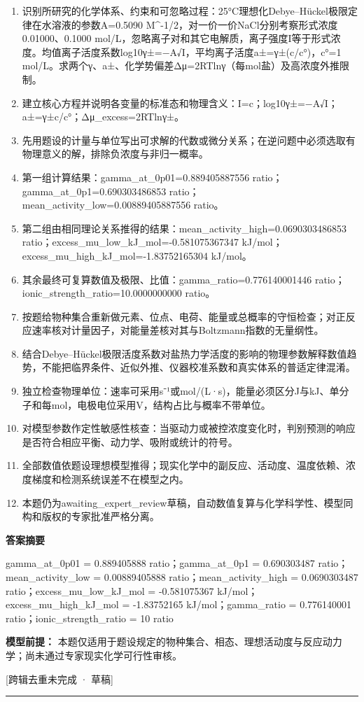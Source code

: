 \documentclass[UTF8,11pt,a4paper]{ctexart}
\begin{document}
\begin{enumerate}
\item 识别所研究的化学体系、约束和可忽略过程：25°C理想化Debye–Hückel极限定律在水溶液的参数A=0.5090 M\textasciicircum{}-1/2，对一价一价NaCl分别考察形式浓度0.01000、0.1000 mol/L，忽略离子对和其它电解质，离子强度I等于形式浓度。均值离子活度系数log10γ±=−A√I，平均离子活度a±=γ±(c/c°)，c°=1 mol/L。求两个γ、a±、化学势偏差Δμ=2RTlnγ（每mol盐）及高浓度外推限制。
\item 建立核心方程并说明各变量的标准态和物理含义：I=c；log10γ±=−A√I；a±=γ±c/c°；Δμ\_excess=2RTlnγ±。
\item 先用题设的计量与单位写出可求解的代数或微分关系；在逆问题中必须选取有物理意义的解，排除负浓度与非归一概率。
\item 第一组计算结果：gamma\_at\_0p01=0.889405887556 ratio；gamma\_at\_0p1=0.690303486853 ratio；mean\_activity\_low=0.00889405887556 ratio。
\item 第二组由相同理论关系推得的结果：mean\_activity\_high=0.0690303486853 ratio；excess\_mu\_low\_kJ\_mol=-0.581075367347 kJ/mol；excess\_mu\_high\_kJ\_mol=-1.83752165304 kJ/mol。
\item 其余最终可复算数值及极限、比值：gamma\_ratio=0.776140001446 ratio；ionic\_strength\_ratio=10.0000000000 ratio。
\item 按题给物种集合重新做元素、位点、电荷、能量或总概率的守恒检查；对正反应速率核对计量因子，对能量差核对其与Boltzmann指数的无量纲性。
\item 结合Debye–Hückel极限活度系数对盐热力学活度的影响的物理参数解释数值趋势，不能把临界条件、近似外推、仪器校准系数和真实体系的普适定律混淆。
\item 独立检查物理单位：速率可采用s⁻¹或mol/(L·s)，能量必须区分J与kJ、单分子和每mol，电极电位采用V，结构占比与概率不带单位。
\item 对模型参数作定性敏感性核查：当驱动力或被控浓度变化时，判别预测的响应是否符合相应平衡、动力学、吸附或统计的符号。
\item 全部数值依题设理想模型推得；现实化学中的副反应、活动度、温度依赖、浓度梯度和检测系统误差不在模型之内。
\item 本题仍为awaiting\_expert\_review草稿，自动数值复算与化学科学性、模型同构和版权的专家批准严格分离。
\end{enumerate}
\noindent\textbf{答案摘要}\par
gamma\_at\_0p01 = 0.889405888 ratio；gamma\_at\_0p1 = 0.690303487 ratio；mean\_activity\_low = 0.00889405888 ratio；mean\_activity\_high = 0.0690303487 ratio；excess\_mu\_low\_kJ\_mol = -0.581075367 kJ/mol；excess\_mu\_high\_kJ\_mol = -1.83752165 kJ/mol；gamma\_ratio = 0.776140001 ratio；ionic\_strength\_ratio = 10 ratio\par
\noindent\textbf{模型前提：}
本题仅适用于题设规定的物种集合、相态、理想活动度与反应动力学；尚未通过专家现实化学可行性审核。\par
\noindent\textcolor{red!65!black}{[跨辑去重未完成 · 草稿]} \par
\medskip\hrule\medskip
{}
\end{document}
